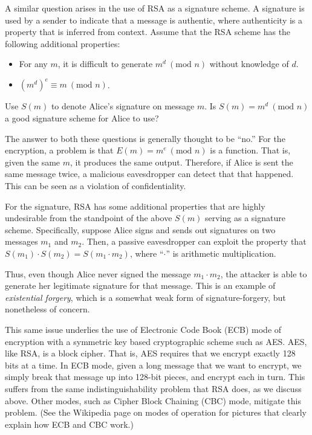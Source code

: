A similar question arises in the use of RSA as a signature scheme.
A signature is used by a sender to indicate that a message is authentic, where
authenticity is a property that is inferred from context.
Assume that the RSA scheme has the following additional properties:
\begin{itemize}
    \item For any $m$, it is difficult to generate $m^d~(\text{mod } n)$ without
	knowledge of $d$.
    \item $\left(m^d\right)^e \equiv m~(\text{mod } n)$.
\end{itemize}

Use $S(m)$ to denote Alice's signature on message $m$.
Is $S(m) = m^d~(\text{mod } n)$ a good signature scheme for Alice to use?

The answer to both these questions is generally thought to be ``no.'' For
the encryption, a problem is that $E(m) = m^e~(\text{mod } n)$ is a function.
That is, given the same $m$, it produces the same output. Therefore, if Alice
is sent the same message twice, a malicious eavesdropper can detect that that
happened. This can be seen as a violation of confidentiality.

For the signature, RSA has some additional properties that are highly undesirable
from the standpoint of the above $S(m)$ serving as a signature scheme.
Specifically, suppose Alice signs and sends out signatures on two messages
$m_1$ and $m_2$. Then, a passive eavesdropper can exploit the property that
$S(m_1) \cdot S(m_2) = S(m_1 \cdot m_2)$, where ``$\cdot$'' is arithmetic
multiplication.

Thus, even though Alice never signed the message $m_1 \cdot m_2$, the attacker
is able to generate her legitimate signature for that message. This is an
example of \emph{existential forgery}, which is a somewhat weak form of
signature-forgery, but nonetheless of concern.

This same issue underlies the use of Electronic Code Book (ECB) mode of
encryption with a symmetric key based cryptographic scheme such as AES.
AES, like RSA, is a block cipher. That is, AES requires that we encrypt
exactly 128 bits at a time. In ECB mode, given a long message that we want
to encrypt, we simply break that message up into 128-bit pieces, and encrypt
each in turn. This suffers from the same indistinguishability problem that RSA
does, as we discuss above. Other modes, such as Cipher Block Chaining (CBC)
mode, mitigate this problem. (See the Wikipedia page on modes of operation
for pictures that clearly explain how ECB and CBC work.)

